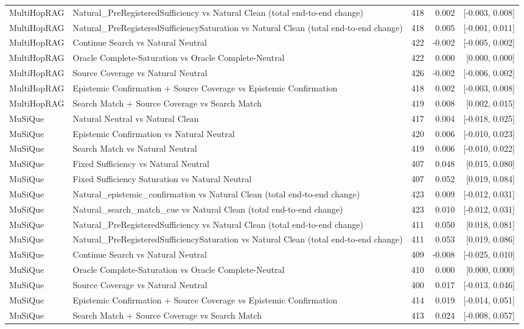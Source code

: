 \begin{table}[t]
\begin{tabular}{llrrr}
MultiHopRAG & Natural\_PreRegisteredSufficiency vs Natural Clean (total end-to-end change) & 418 & 0.002 & [-0.003, 0.008] \\
MultiHopRAG & Natural\_PreRegisteredSufficiencySaturation vs Natural Clean (total end-to-end change) & 418 & 0.005 & [-0.001, 0.011] \\
MultiHopRAG & Continue Search vs Natural Neutral & 422 & -0.002 & [-0.005, 0.002] \\
MultiHopRAG & Oracle Complete-Saturation vs Oracle Complete-Neutral & 422 & 0.000 & [0.000, 0.000] \\
MultiHopRAG & Source Coverage vs Natural Neutral & 426 & -0.002 & [-0.006, 0.002] \\
MultiHopRAG & Epistemic Confirmation + Source Coverage vs Epistemic Confirmation & 418 & 0.002 & [-0.003, 0.008] \\
MultiHopRAG & Search Match + Source Coverage vs Search Match & 419 & 0.008 & [0.002, 0.015] \\
MuSiQue & Natural Neutral vs Natural Clean & 417 & 0.004 & [-0.018, 0.025] \\
MuSiQue & Epistemic Confirmation vs Natural Neutral & 420 & 0.006 & [-0.010, 0.023] \\
MuSiQue & Search Match vs Natural Neutral & 419 & 0.006 & [-0.010, 0.022] \\
MuSiQue & Fixed Sufficiency vs Natural Neutral & 407 & 0.048 & [0.015, 0.080] \\
MuSiQue & Fixed Sufficiency Saturation vs Natural Neutral & 407 & 0.052 & [0.019, 0.084] \\
MuSiQue & Natural\_epistemic\_confirmation vs Natural Clean (total end-to-end change) & 423 & 0.009 & [-0.012, 0.031] \\
MuSiQue & Natural\_search\_match\_cue vs Natural Clean (total end-to-end change) & 423 & 0.010 & [-0.012, 0.031] \\
MuSiQue & Natural\_PreRegisteredSufficiency vs Natural Clean (total end-to-end change) & 411 & 0.050 & [0.018, 0.081] \\
MuSiQue & Natural\_PreRegisteredSufficiencySaturation vs Natural Clean (total end-to-end change) & 411 & 0.053 & [0.019, 0.086] \\
MuSiQue & Continue Search vs Natural Neutral & 409 & -0.008 & [-0.025, 0.010] \\
MuSiQue & Oracle Complete-Saturation vs Oracle Complete-Neutral & 410 & 0.000 & [0.000, 0.000] \\
MuSiQue & Source Coverage vs Natural Neutral & 400 & 0.017 & [-0.013, 0.046] \\
MuSiQue & Epistemic Confirmation + Source Coverage vs Epistemic Confirmation & 414 & 0.019 & [-0.014, 0.051] \\
MuSiQue & Search Match + Source Coverage vs Search Match & 413 & 0.024 & [-0.008, 0.057] \\
\bottomrule
\end{tabular}
\end{table}
